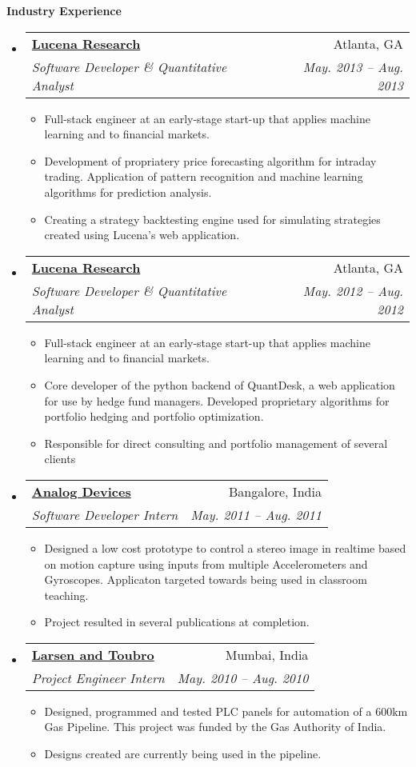 \documentclass[letterpaper,9pt]{article}
\makeatletter
\newcommand{\resitem}[1]{\item #1 \vspace{-2pt}}
\newcommand{\resheading}[1]{{ \colorbox{mygrey}{\begin{minipage}{\textwidth}{\textbf{#1 \vphantom{p\^{E}}}}\end{minipage}}}}
\newcommand{\ressubheading}[4]{
\begin{tabular*}{6.5in}{l@{\extracolsep{\fill}}r}
        \textbf{#1} & #2 \\
        \textit{\small#3} & \textit{\small#4} \\
\end{tabular*}\vspace{-6pt}}
\makeatother
\begin{document}
\resheading{Industry Experience}
	\vspace{-13pt}
	\begin{itemize}
		\item 
			\ressubheading{\href{http://www.lucenaresearch.com}{Lucena Research}}{Atlanta, GA}{Software Developer \& Quantitative Analyst}{May. 2013 -- Aug. 2013}
				{ \small
				\begin{itemize}
					\resitem{Full-stack engineer at an early-stage start-up that applies machine learning and to financial markets.}
					\resitem{Development of propriatery price forecasting algorithm for intraday trading. Application of pattern recognition and machine learning algorithms for prediction analysis.}
					\resitem{Creating a strategy backtesting engine used for simulating strategies created using Lucena's web application.}
				\end{itemize}
				}
		\item 
			\ressubheading{\href{http://www.lucenaresearch.com}{Lucena Research}}{Atlanta, GA}{Software Developer \& Quantitative Analyst}{May. 2012 -- Aug. 2012}
				{ \small
				\begin{itemize}
					\resitem{Full-stack engineer at an early-stage start-up that applies machine learning and to financial markets.}
					\resitem{Core developer of the python backend of QuantDesk, a web application for use by hedge fund managers. Developed proprietary algorithms for portfolio hedging and portfolio optimization.}
					\resitem{Responsible for direct consulting and portfolio management of several clients}
				\end{itemize}
				}
		\item 
			\ressubheading{\href{http://www.analog.com}{Analog Devices}}{Bangalore, India}{Software Developer Intern}{May. 2011 -- Aug. 2011}
				{ \small
				\begin{itemize}
					\resitem{Designed a low cost prototype to control a stereo image in realtime based on motion capture using inputs from multiple Accelerometers and Gyroscopes. Applicaton targeted towards being used in classroom teaching.}
					\resitem{Project resulted in several publications at completion.}
				\end{itemize}
				}
		\item 
			\ressubheading{\href{http://www.larsentoubro.com}{Larsen and Toubro}}{Mumbai, India}{Project Engineer Intern}{May. 2010 -- Aug. 2010}
				{ \small
				\begin{itemize}
					\resitem{Designed, programmed and tested PLC panels for automation of a 600km Gas Pipeline. This project was funded by the Gas Authority of India.}
					\resitem{Designs created are currently being used in the pipeline.}
				\end{itemize}
				}
	\end{itemize}  %
\end{document}
